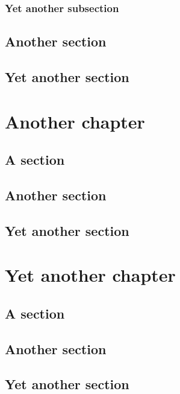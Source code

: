 \documentclass{abe}
\begin{document}
\subsection{Yet another subsection}
\section{Another section}
\section{Yet another section}

\chapter{Another chapter}
\section{A section}
\section{Another section}
\section{Yet another section}

\chapter{Yet another chapter}
\section{A section}
\section{Another section}
\section{Yet another section}

\backmatter%
 
\end{document}
